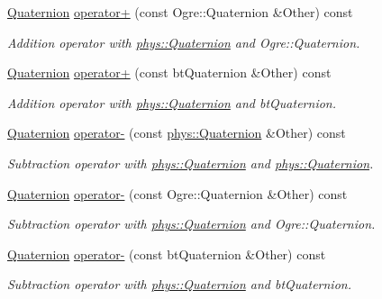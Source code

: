 \begin{DoxyCompactItemize}
\hyperlink{classphys_1_1Quaternion}{Quaternion} \hyperlink{classphys_1_1Quaternion_a71fcb37dae7602349e856b202ca00e89}{operator+} (const Ogre::Quaternion \&Other) const 
\begin{DoxyCompactList}\small\item\em Addition operator with \hyperlink{classphys_1_1Quaternion}{phys::Quaternion} and Ogre::Quaternion. \item\end{DoxyCompactList}\item 
\hyperlink{classphys_1_1Quaternion}{Quaternion} \hyperlink{classphys_1_1Quaternion_a3dc35eeb41c43ce79fdf2fc64fc15532}{operator+} (const btQuaternion \&Other) const 
\begin{DoxyCompactList}\small\item\em Addition operator with \hyperlink{classphys_1_1Quaternion}{phys::Quaternion} and btQuaternion. \item\end{DoxyCompactList}\item 
\hyperlink{classphys_1_1Quaternion}{Quaternion} \hyperlink{classphys_1_1Quaternion_abab2d787eefc90bbc6710091a5a79234}{operator-\/} (const \hyperlink{classphys_1_1Quaternion}{phys::Quaternion} \&Other) const 
\begin{DoxyCompactList}\small\item\em Subtraction operator with \hyperlink{classphys_1_1Quaternion}{phys::Quaternion} and \hyperlink{classphys_1_1Quaternion}{phys::Quaternion}. \item\end{DoxyCompactList}\item 
\hyperlink{classphys_1_1Quaternion}{Quaternion} \hyperlink{classphys_1_1Quaternion_a01c5412ce8f1ebb212c9afd7e19feb1e}{operator-\/} (const Ogre::Quaternion \&Other) const 
\begin{DoxyCompactList}\small\item\em Subtraction operator with \hyperlink{classphys_1_1Quaternion}{phys::Quaternion} and Ogre::Quaternion. \item\end{DoxyCompactList}\item 
\hyperlink{classphys_1_1Quaternion}{Quaternion} \hyperlink{classphys_1_1Quaternion_aca49f84681f836545c30c0b42480dccc}{operator-\/} (const btQuaternion \&Other) const 
\begin{DoxyCompactList}\small\item\em Subtraction operator with \hyperlink{classphys_1_1Quaternion}{phys::Quaternion} and btQuaternion. \item\end{DoxyCompactList}\item 

\end{DoxyCompactItemize}
